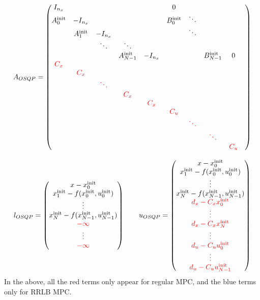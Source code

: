 \documentclass[12pt]{article}
\begin{document}
$$A_{OSQP}=\begin{pmatrix}
	I_{n_x}&&&&&0&&&&\\
	A_{0}^{\rm{init}}&-I_{n_x}&&&&B_{0}^{\rm{init}}&\ddots&&\\
	&A_{1}^{\rm{init}}&-I_{n_x}&&&&\ddots&&\\
	&&\ddots&\ddots&&&&&\\
	&&&A_{N-1}^{\rm{init}}&-I_{n_x}&&&B_{N-1}^{\rm{init}}&0\\
	\color{red}C_x&&&&&&&&\\
	&\color{red}C_x&&&&&&&\\
	&&\color{red}\ddots&&&&&&\\
	&&&\color{red}C_x&&&&&\\
	&&&&\color{red}C_x&&&&\\
	&&&&&\color{red}C_u&&&\\
	&&&&&&\color{red}\ddots&&\\
	&&&&&&&\color{red}\ddots&\\
	&&&&&&&&\color{red}C_u
\end{pmatrix}$$

$$l_{OSQP}=\begin{pmatrix}
	x-x_0^{\rm{init}}\\x_{1}^{\rm{init}}-f(x_0^{\rm{init}},u_0^{\rm{init}})\\\vdots\\x_{N}^{\rm{init}}-f(x_{N-1}^{\rm{init}},u_{N-1}^{\rm{init}})\\\color{red}-\infty\\\color{red}\vdots\\\color{red}-\infty
\end{pmatrix}\qquad u_{OSQP}=\begin{pmatrix}
	x-x_0^{\rm{init}}\\x_{1}^{\rm{init}}-f(x_0^{\rm{init}},u_0^{\rm{init}})\\\vdots\\x_{N}^{\rm{init}}-f(x_{N-1}^{\rm{init}},u_{N-1}^{\rm{init}})\\\color{red}d_x-C_xx_0^{\rm{init}}\\\color{red}\vdots\\\color{red}d_x-C_xx_N^{\rm{init}}\\\color{red}\vdots\\\color{red}d_u-C_uu_{0}^{\rm{init}}\\\color{red}\vdots\\\color{red}d_u-C_uu_{N-1}^{\rm{init}}
\end{pmatrix}$$
\normalsize
In the above, all the red terms only appear for regular MPC, and the blue terms only for RRLB MPC.
\end{document}
